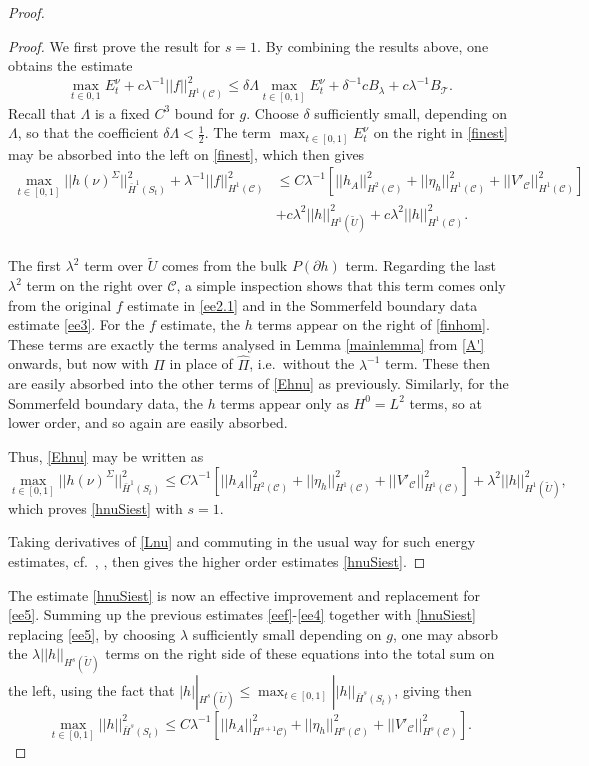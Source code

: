 \documentclass[10pt]{amsart}
\renewcommand{\d}{\delta}
\newcommand{\Si}{\Sigma}
\renewcommand{\l}{\lambda}
\newcommand{\cC}{{\mathcal C}}
\newcommand{\cT}{{\mathcal T}}
\newcommand{\be}{\begin{equation}}
\newcommand{\ee}{\end{equation}}
\newcommand{\p}{\partial}
\renewcommand{\hat}{\widehat}
\newcommand{\<}{\langle}
\renewcommand{\>}{\rangle}
\newcommand{\w}{\widetilde}
\theoremstyle{plain}
\theoremstyle{remark}
\theoremstyle{definition}
\numberwithin{equation}{section}
\begin{document}
\begin{proof}
\begin{proof}
We first prove the result for $s = 1$. By combining the results above, one obtains the estimate 
\be \label{finest}
\max_{t\in 0,1}E_t^{\nu}  + c\l^{-1}||f||_{H^1(\cC)}^2 \leq  \d \Lambda \max_{t\in [0,1]}E_t^{\nu} + 
\d^{-1} cB_{\l} + c\l^{-1}B_{\cT}. 
\ee
Recall that $\Lambda$ is a fixed $C^3$ bound for $g$. Choose $\d$ sufficiently small, depending on $\Lambda$, so that the coefficient $\d \Lambda < \frac{1}{2}$. 
The term $\max_{t\in [0,1]}E_t^{\nu}$ on the right in \eqref{finest} may be absorbed into the left on \eqref{finest}, which then gives 
\be \label{Ehnu}
\begin{split}
\max_{t \in [0,1]}||h(\nu)^{\Si}||_{\bar H^1(S_t)}^2 + \l^{-1}||f||_{H^1(\cC)}^2 & \leq  C\l^{-1}[||h_A||_{H^{2}(\cC)}^2 + ||\eta_h||_{H^1(\cC)}^2 + ||V'_{\cC}||_{H^1(\cC)}^2 ] \\
& + c\l^2 ||h||_{H^1(\w U)}^2  + c\l^2 ||h||_{H^1(\cC)}^2 . \\
\end{split}
\ee

  The first $\l^2$ term over $\w U$ comes from the bulk $P(\p h)$ term. Regarding the last $\l^2$ term on the right over $\cC$, a simple inspection shows that this term 
comes only from the original $f$ estimate in \eqref{ee2.1} and in the Sommerfeld boundary data estimate \eqref{ee3}. For the $f$ estimate, the $h$ terms appear on the 
right of \eqref{finhom}.  These terms are exactly the terms analysed in Lemma \ref{mainlemma} from \eqref{A'} onwards, but now with $\Pi$ in place of $\hat \Pi$, i.e.~without 
the $\l^{-1}$ term. These then are easily absorbed into the other terms of \eqref{Ehnu} as previously. Similarly, for the Sommerfeld boundary data, the $h$ terms appear 
only as $H^0 = L^2$ terms, so at lower order, and so again are easily absorbed. 

  Thus, \eqref{Ehnu} may be written as 
\be \label{Ehnu1}
\max_{t \in [0,1]}||h(\nu)^{\Si}||_{\bar H^1(S_t)}^2  \leq  C\l^{-1}[||h_A||_{H^{2}(\cC)}^2 + ||\eta_h||_{H^1(\cC)}^2 + ||V'_{\cC}||_{H^1(\cC)}^2 ]
+ \l^2 ||h||_{H^1(\w U)}^2 , 
\ee
which proves \eqref{hnuSiest} with $s = 1$. 

  Taking derivatives of \eqref{Lnu} and commuting in the usual way for such energy estimates, cf.~\cite{BS}, \cite{Sa}, then gives the higher order estimates 
\eqref{hnuSiest}. 



\end{proof}

The estimate \eqref{hnuSiest} is now an effective improvement and replacement for \eqref{ee5}. Summing up the previous estimates 
\eqref{eef}-\eqref{ee4} together with \eqref{hnuSiest} replacing \eqref{ee5}, by choosing $\l$ sufficiently small depending on $g$, one may absorb 
the $\l ||h||_{H^s(\w U)}$ terms on the right side of these equations into the total sum on the left, using the fact that 
$|h||_{H^s(\w U)} \leq \max_{t\in [0,1]}||h||_{\bar H^s(S_t)}$, giving then 
\be \label{Etot}
\max_{t\in [0,1]} ||h||_{\bar H^s(S_t)}^2 \leq  C\l^{-1}[ ||h_A||_{H^{s+1}\cC)}^2 + ||\eta_h||_{H^{s}(\cC)}^2 + ||V'_{\cC}||_{H^s(\cC)}^2]. 
\ee


\end{proof}
\end{document}
